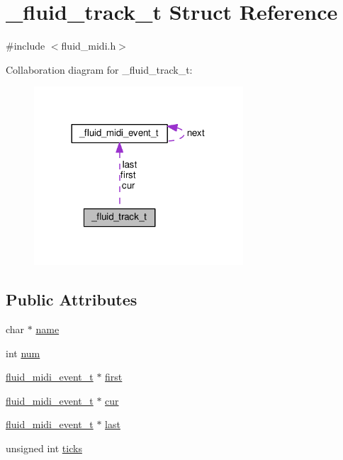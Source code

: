 \hypertarget{struct__fluid__track__t}{}\section{\+\_\+fluid\+\_\+track\+\_\+t Struct Reference}
\label{struct__fluid__track__t}


{\ttfamily \#include $<$fluid\+\_\+midi.\+h$>$}



Collaboration diagram for \+\_\+fluid\+\_\+track\+\_\+t\+:
\nopagebreak
\begin{figure}[H]
\begin{center}
\leavevmode
\includegraphics[width=221pt]{struct__fluid__track__t__coll__graph}
\end{center}
\end{figure}
\subsection*{Public Attributes}
\begin{DoxyCompactItemize}
\item 
char $\ast$ \hyperlink{struct__fluid__track__t_abe079916ae5ec9b911b4a4b256b8b85f}{name}
\item 
int \hyperlink{struct__fluid__track__t_a5a7355b3a3a63d85fbc1f7d530c85beb}{num}
\item 
\hyperlink{types_8h_a61c72b76e3ee344637994c3071f74d94}{fluid\+\_\+midi\+\_\+event\+\_\+t} $\ast$ \hyperlink{struct__fluid__track__t_a29479cf7bb1c867fbd23809b3ae60f21}{first}
\item 
\hyperlink{types_8h_a61c72b76e3ee344637994c3071f74d94}{fluid\+\_\+midi\+\_\+event\+\_\+t} $\ast$ \hyperlink{struct__fluid__track__t_a1e6974f6d8987199412024002394659d}{cur}
\item 
\hyperlink{types_8h_a61c72b76e3ee344637994c3071f74d94}{fluid\+\_\+midi\+\_\+event\+\_\+t} $\ast$ \hyperlink{struct__fluid__track__t_ade8bd77b7d248b46226c3dda4368d791}{last}
\item 
unsigned int \hyperlink{struct__fluid__track__t_a000f5183fac347c6daafa6d04a5843d2}{ticks}
\end{DoxyCompactItemize}


